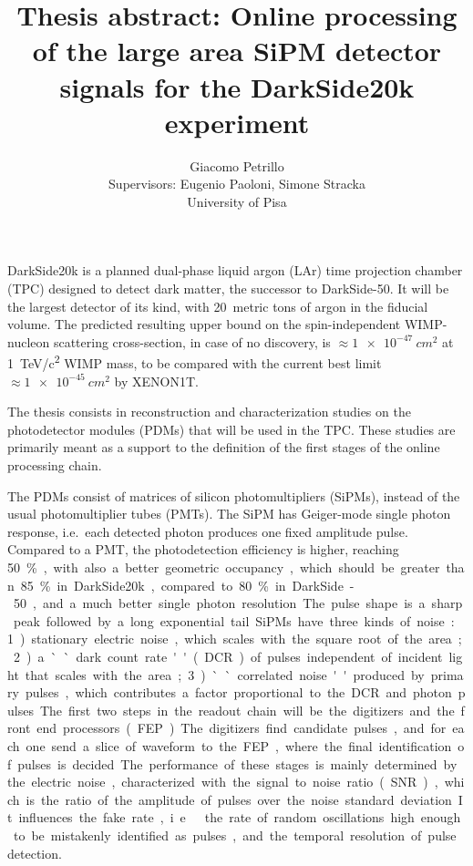 \documentclass[11pt]{article}
\author{Giacomo Petrillo\\
Supervisors: Eugenio Paoloni, Simone Stracka\\
University of Pisa}
\title{Thesis abstract: Online processing of the large area SiPM detector
signals for the DarkSide20k experiment}
\begin{document}
    
    \maketitle

    DarkSide20k is a planned dual-phase liquid argon (LAr) time projection
    chamber (TPC) designed to detect dark matter, the successor to DarkSide-50.
    It will be the largest detector of its kind, with 20~metric tons of argon
    in the fiducial volume. The predicted resulting upper bound on the
    spin-independent WIMP-nucleon scattering cross-section, in case of no
    discovery, is $\approx\SI{1e-47}{cm^2}$ at \SI{1}{TeV/c^2} WIMP mass, to be
    compared with the current best limit $\approx\SI{1e-45}{cm^2}$ by XENON1T.
    
    The thesis consists in reconstruction and characterization studies on the
    photodetector modules (PDMs) that will be used in the TPC. These studies
    are primarily meant as a support to the definition of the first stages of
    the online processing chain.
    
    The PDMs consist of matrices of silicon photomultipliers (SiPMs), instead
    of the usual photomultiplier tubes (PMTs). The SiPM has Geiger-mode single
    photon response, i.e.\ each detected photon produces one fixed amplitude
    pulse. Compared to a PMT, the photodetection efficiency is higher, reaching
    \SI{50}\%, with also a better geometric occupancy, which should be greater
    than \SI{85}\% in DarkSide20k, compared to \SI{80}\% in DarkSide-50, and a
    much better single photon resolution. The pulse shape is a sharp peak
    followed by a long exponential tail.
    
    
    SiPMs have three kinds of noise: 1) stationary electric noise, which scales
    with the square root of the area; 2) a ``dark count rate'' (DCR) of pulses
    independent of incident light that scales with the area; 3) ``correlated
    noise'' produced by primary pulses, which contributes a factor proportional
    to the DCR and photon pulses.
    
    The first two steps in the readout chain will be the digitizers and the
    front end processors (FEP). The digitizers find candidate pulses, and for
    each one send a slice of waveform to the FEP, where the final
    identification of pulses is decided. The performance of these stages is
    mainly determined by the electric noise, characterized with the signal to
    noise ratio (SNR), which is the ratio of the amplitude of pulses over the
    noise standard deviation. It influences the fake rate, i.e.\ the rate of
    random oscillations high enough to be mistakenly identified as pulses, and
    the temporal resolution of pulse detection.
    
\end{document}
